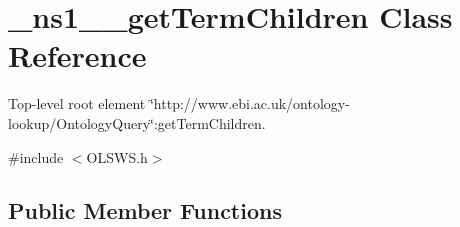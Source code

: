 \hypertarget{class__ns1____getTermChildren}{
\section{\_\-ns1\_\-\_\-getTermChildren Class Reference}
\label{class__ns1____getTermChildren}
}


Top-\/level root element \char`\"{}http://www.ebi.ac.uk/ontology-\/lookup/OntologyQuery\char`\"{}:getTermChildren.  




{\ttfamily \#include $<$OLSWS.h$>$}

\subsection*{Public Member Functions}
